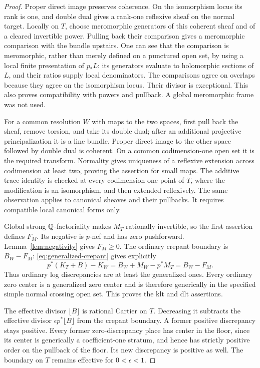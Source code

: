 \begin{proof}
Proper direct image preserves coherence.  On the isomorphism locus its
rank is one, and double dual gives a rank-one reflexive sheaf on the
normal target.  Locally on $T$, choose meromorphic generators of this
coherent sheaf and of a cleared invertible power.  Pulling back their
comparison gives a meromorphic comparison with the bundle upstairs.
One can see that the comparison is meromorphic, rather than merely
defined on a punctured open set, by using a local finite presentation
of $p_*L$: its generators evaluate to holomorphic sections of $L$, and
their ratios supply local denominators.  The comparisons agree on
overlaps because they agree on the isomorphism locus.  Their divisor
is exceptional.  This also proves compatibility with powers and
pullback.  A global meromorphic frame was not used.

For a common resolution $W$ with maps to the two spaces, first pull
back the sheaf, remove torsion, and take its double dual; after an
additional projective principalization it is a line bundle.  Proper
direct image to the other space followed by double dual is coherent.
On a common codimension-one open set it is the required transform.
Normality gives uniqueness of a reflexive extension across codimension
at least two, proving the assertion for small maps.
The additive trace identity is checked at every codimension-one point
of $T$, where the modification is an isomorphism, and then extended
reflexively.  The same observation applies to canonical sheaves and
their pullbacks.  It requires compatible local canonical forms only.

Global strong $\mathbb Q$-factoriality makes $M_T$ rationally invertible, so
the first assertion defines $F_M$.  Its negative is $p$-nef and has
zero pushforward.  Lemma~\ref{lem:negativity} gives $F_M\geq0$.  The ordinary crepant boundary is $B_W-F_M$:
\eqref{eq:generalized-crepant} gives explicitly
\[
 p^*(K_T+B)-K_W=B_W+M_W-p^*M_T=B_W-F_M.
\]
Thus ordinary log discrepancies are at least the generalized ones.
Every ordinary zero center is a generalized zero center and is
therefore generically in the specified simple normal crossing open
set.  This proves the klt and dlt assertions.

The effective divisor $\lfloor B\rfloor$ is rational Cartier on $T$.
Decreasing it subtracts the effective divisor
$\epsilon p^*\lfloor B\rfloor$ from the crepant boundary.  A former
positive discrepancy stays positive.  Every former zero-discrepancy
place has center in the floor, since its center is generically a
coefficient-one stratum, and hence has strictly positive order on the
pullback of the floor.  Its new discrepancy is positive as well.  The
boundary on $T$ remains effective for $0<\epsilon<1$.
\end{proof}

